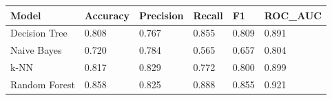 \begin{tabular}{llllll}
\toprule
Model & Accuracy & Precision & Recall & F1 & ROC\_AUC \\
\midrule
Decision Tree & 0.808 & 0.767 & 0.855 & 0.809 & 0.891 \\
Naive Bayes & 0.720 & 0.784 & 0.565 & 0.657 & 0.804 \\
k-NN & 0.817 & 0.829 & 0.772 & 0.800 & 0.899 \\
Random Forest & 0.858 & 0.825 & 0.888 & 0.855 & 0.921 \\
\bottomrule
\end{tabular}
